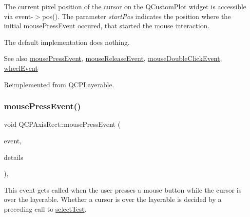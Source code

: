 The current pixel position of the cursor on the \hyperlink{class_q_custom_plot}{Q\+Custom\+Plot} widget is accessible via {\ttfamily event-\/$>$pos()}. The parameter {\itshape start\+Pos} indicates the position where the initial \hyperlink{class_q_c_p_axis_rect_aa9a7c807eaa4666870ac94aa6abc4dde}{mouse\+Press\+Event} occured, that started the mouse interaction.

The default implementation does nothing.

\begin{DoxySeeAlso}{See also}
\hyperlink{class_q_c_p_axis_rect_aa9a7c807eaa4666870ac94aa6abc4dde}{mouse\+Press\+Event}, \hyperlink{class_q_c_p_axis_rect_a6c89b988d3a0b93c0878f0ebdb5037f4}{mouse\+Release\+Event}, \hyperlink{class_q_c_p_layerable_a4171e2e823aca242dd0279f00ed2de81}{mouse\+Double\+Click\+Event}, \hyperlink{class_q_c_p_axis_rect_a93eeaa0c127d6d6fe8171b2455080262}{wheel\+Event} 
\end{DoxySeeAlso}


Reimplemented from \hyperlink{class_q_c_p_layerable_a9eee1ba47fd69be111059ca3881933e4}{Q\+C\+P\+Layerable}.

\mbox{\label{class_q_c_p_axis_rect_aa9a7c807eaa4666870ac94aa6abc4dde}} 
\subsubsection{\texorpdfstring{mouse\+Press\+Event()}{mousePressEvent()}}
{\footnotesize\ttfamily void Q\+C\+P\+Axis\+Rect\+::mouse\+Press\+Event (\begin{DoxyParamCaption}\item[{Q\+Mouse\+Event $\ast$}]{event,  }\item[{const Q\+Variant \&}]{details }\end{DoxyParamCaption})\hspace{0.3cm}{\ttfamily [protected]}, {\ttfamily [virtual]}}

This event gets called when the user presses a mouse button while the cursor is over the layerable. Whether a cursor is over the layerable is decided by a preceding call to \hyperlink{class_q_c_p_layout_element_ae97f483cccedadbf18ea4525ef240ee4}{select\+Test}.


